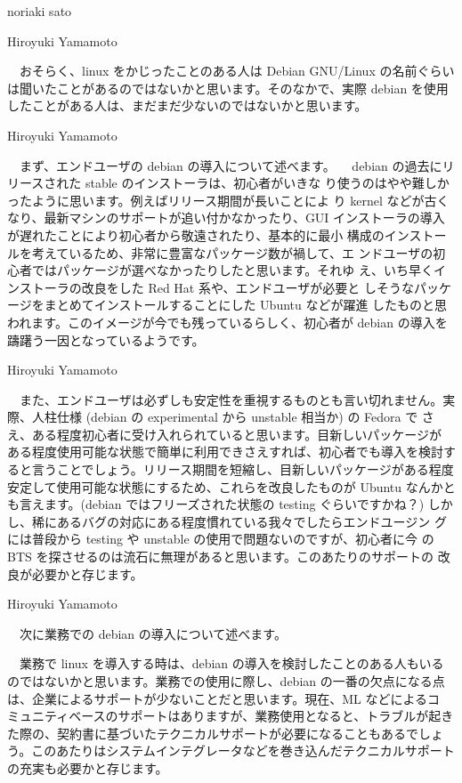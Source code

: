 \documentclass[cjk,dvipdfmx,12pt]{beamer}
\begin{document}
\begin{frame}{noriaki sato}
\end{frame}\begin{frame}{Hiroyuki Yamamoto}

　おそらく、linux をかじったことのある人は Debian GNU/Linux の名前ぐらい
は聞いたことがあるのではないかと思います。そのなかで、実際 debian を使用
したことがある人は、まだまだ少ないのではないかと思います。

\end{frame}\begin{frame}{Hiroyuki Yamamoto}

　まず、エンドユーザの debian の導入について述べます。
　debian の過去にリリースされた stable のインストーラは、初心者がいきな
り使うのはやや難しかったように思います。例えばリリース期間が長いことによ
り kernel などが古くなり、最新マシンのサポートが追い付かなかったり、GUI
インストーラの導入が遅れたことにより初心者から敬遠されたり、基本的に最小
構成のインストールを考えているため、非常に豊富なパッケージ数が禍して、エ
ンドユーザの初心者ではパッケージが選べなかったりしたと思います。それゆ
え、いち早くインストーラの改良をした Red Hat 系や、エンドユーザが必要と
しそうなパッケージをまとめてインストールすることにした Ubuntu などが躍進
したものと思われます。このイメージが今でも残っているらしく、初心者が
debian の導入を躊躇う一因となっているようです。

\end{frame}\begin{frame}{Hiroyuki Yamamoto}

　また、エンドユーザは必ずしも安定性を重視するものとも言い切れません。実
際、人柱仕様 (debian の experimental から unstable 相当か) の Fedora で
さえ、ある程度初心者に受け入れられていると思います。目新しいパッケージが
ある程度使用可能な状態で簡単に利用できさえすれば、初心者でも導入を検討す
ると言うことでしょう。リリース期間を短縮し、目新しいパッケージがある程度
安定して使用可能な状態にするため、これらを改良したものが Ubuntu なんかと
も言えます。(debian ではフリーズされた状態の testing ぐらいですかね？)
しかし、稀にあるバグの対応にある程度慣れている我々でしたらエンドユージン
グには普段から testing や unstable の使用で問題ないのですが、初心者に今
の BTS を探させるのは流石に無理があると思います。このあたりのサポートの
改良が必要かと存じます。

\end{frame}\begin{frame}{Hiroyuki Yamamoto}

　次に業務での debian の導入について述べます。

　業務で linux を導入する時は、debian の導入を検討したことのある人もいる
のではないかと思います。業務での使用に際し、debian の一番の欠点になる点
は、企業によるサポートが少ないことだと思います。現在、ML などによるコ
ミュニティベースのサポートはありますが、業務使用となると、トラブルが起き
た際の、契約書に基づいたテクニカルサポートが必要になることもあるでしょ
う。このあたりはシステムインテグレータなどを巻き込んだテクニカルサポート
の充実も必要かと存じます。


\end{frame}
\end{document}
